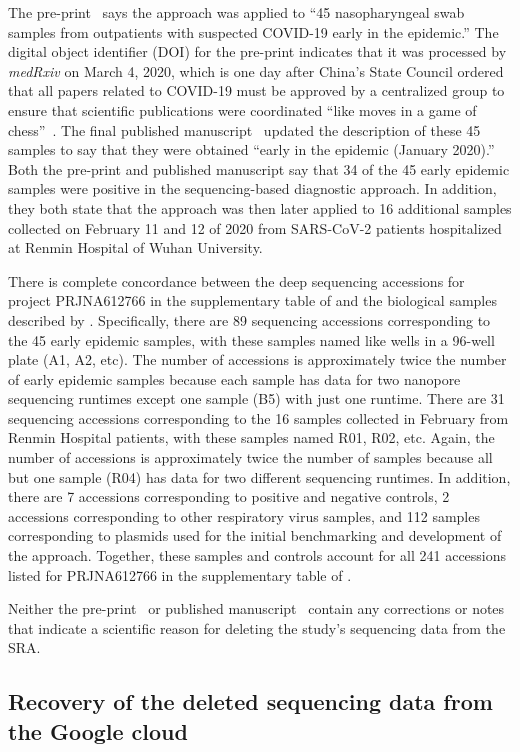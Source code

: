 \documentclass[9pt,twocolumn,twoside]{gsajnl_modified}
\begin{document}
The pre-print~\citep{Wang2020medRxiv} says the approach was applied to ``45 nasopharyngeal swab samples from outpatients with suspected COVID-19 early in the epidemic.''
The digital object identifier (DOI) for the pre-print indicates that it was processed by \textit{medRxiv} on March 4, 2020, which is one day after China's State Council ordered that all papers related to COVID-19 must be approved by a centralized group to ensure that scientific publications were coordinated ``like moves in a game of chess''~\citep{Kang2020}.
The final published manuscript~\citep{Wang2020small} updated the description of these 45 samples to say that they were obtained ``early in the epidemic (January 2020).''
Both the pre-print and published manuscript say that 34 of the 45 early epidemic samples were positive in the sequencing-based diagnostic approach.
In addition, they both state that the approach was then later applied to 16 additional samples collected on February 11 and 12 of 2020 from SARS-CoV-2 patients hospitalized at Renmin Hospital of Wuhan University.

There is complete concordance between the deep sequencing accessions for project PRJNA612766 in the supplementary table of \citet{farkas2020insights} and the biological samples described by \citet{Wang2020medRxiv}.
Specifically, there are 89 sequencing accessions corresponding to the 45 early epidemic samples, with these samples named like wells in a 96-well plate (A1, A2, etc).
The number of accessions is approximately twice the number of early epidemic samples because each sample has data for two nanopore sequencing runtimes except one sample (B5) with just one runtime.
 There are 31 sequencing accessions corresponding to the 16 samples collected in February from Renmin Hospital patients, with these samples named R01, R02, etc.
 Again, the number of accessions is approximately twice the number of samples because all but one sample (R04) has data for two different sequencing runtimes.
 In addition, there are 7 accessions corresponding to positive and negative controls, 2 accessions corresponding to other respiratory virus samples, and 112 samples corresponding to plasmids used for the initial benchmarking and development of the approach.
 Together, these samples and controls account for all 241 accessions listed for PRJNA612766 in the supplementary table of \citet{farkas2020insights}.

Neither the pre-print~\citep{Wang2020medRxiv} or published manuscript~\citep{Wang2020small} contain any corrections or notes that indicate a scientific reason for deleting the study's sequencing data from the SRA.

\subsection{Recovery of the deleted sequencing data from the Google cloud} 




\end{document}
